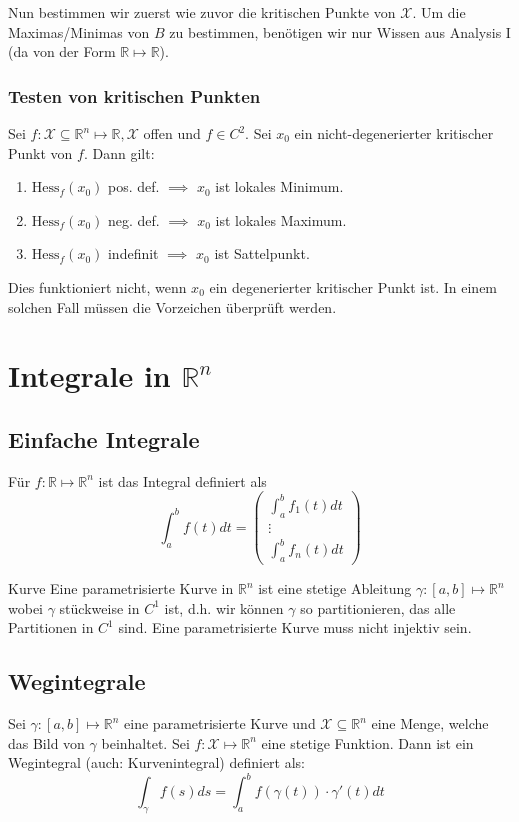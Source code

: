 \documentclass[a4paper,10pt]{article}
\def\R{\mathbb{R}}
\def\X{\mathcal{X}}
\begin{document}
Nun bestimmen wir zuerst wie zuvor die kritischen Punkte von \(\X\). Um die Maximas/Minimas von \(B\) zu bestimmen, benötigen wir nur Wissen aus Analysis I (da von der Form \(\R \mapsto \R\)).
\subsubsection*{Testen von kritischen Punkten}
Sei \(f: \X \subseteq \R^n \mapsto \R, \X\) offen und \(f\in C^2\). Sei \(x_0\) ein nicht-degenerierter kritischer Punkt von \(f\). Dann gilt:
\begin{enumerate}
  \item $\text{Hess}_f(x_0)$ pos. def. \(\implies\) $x_0$ ist lokales Minimum.
  \item $\text{Hess}_f(x_0)$ neg. def. \(\implies\) $x_0$ ist lokales Maximum.
  \item $\text{Hess}_f(x_0)$ indefinit \(\implies\) $x_0$ ist Sattelpunkt.
\end{enumerate}
Dies funktioniert nicht, wenn \(x_0\) ein degenerierter kritischer Punkt ist. In einem solchen Fall müssen die Vorzeichen überprüft werden.

\section{Integrale in \texorpdfstring{\(\R^n\)}{Rⁿ}}
\subsection{Einfache Integrale}
Für \(f: \R \mapsto \R^n\) ist das Integral definiert als
\[\int_a^b f(t)dt = 
\begin{pmatrix*}
  \int_a^b f_1(t) dt \\
  \vdots\\
  \int_a^b f_n(t) dt
\end{pmatrix*}
\]

\begin{mainbox}{Kurve}
  Eine parametrisierte Kurve in \(\R^n\) ist eine stetige Ableitung \(\gamma: \left[a,b\right] \mapsto \R^n\) wobei \(\gamma\) stückweise in \(C^1\) ist, d.h. wir können \(\gamma\) so partitionieren, das alle Partitionen in \(C^1\) sind. Eine parametrisierte Kurve muss nicht injektiv sein.
\end{mainbox}
\subsection{Wegintegrale}
Sei \(\gamma : \left[a,b\right] \mapsto \R^n\) eine parametrisierte Kurve und \(\X \subseteq \R^n\) eine Menge, welche das Bild von \(\gamma\) beinhaltet. Sei \(f : \X \mapsto \R^n\) eine stetige Funktion. Dann ist ein Wegintegral (auch: Kurvenintegral) definiert als:
\[\int_\gamma f(s) ds = \int_a^b f(\gamma(t)) \cdot \gamma'(t) dt\]
\end{document}
